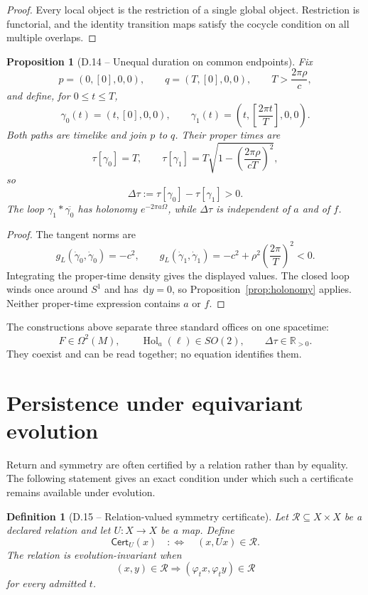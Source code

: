 \documentclass[11pt,letterpaper]{article}
\theoremstyle{dynamicsstyle}
\newtheorem{proposition}[theorem]{Proposition}
\newtheorem{definition}[theorem]{Definition}
\newcommand{\R}{\mathbb{R}}
\newcommand{\Hol}{\operatorname{Hol}}
\newcommand{\dd}{\,\mathrm d}
\newcommand{\Flow}{\varphi}
\newcommand{\Cert}{\mathsf{Cert}}
\begin{document}
\begin{proof}
Every local object is the restriction of a single global object.  Restriction is functorial, and the identity transition maps satisfy the cocycle condition on all multiple overlaps.
\end{proof}

\begin{proposition}[D.14 -- Unequal duration on common endpoints]\label{prop:proper-time}
Fix
\[
p=(0,[0],0,0),
\qquad
q=(T,[0],0,0),
\qquad
T>\frac{2\pi\rho}{c},
\]
and define, for $0\le t\le T$,
\[
\gamma_0(t)=(t,[0],0,0),
\qquad
\gamma_1(t)=\left(t,\left[\frac{2\pi t}{T}\right],0,0\right).
\]
Both paths are timelike and join $p$ to $q$.  Their proper times are
\[
\tau[\gamma_0]=T,
\qquad
\tau[\gamma_1]
=T\sqrt{1-\left(\frac{2\pi\rho}{cT}\right)^2},
\]
so
\[
\Delta\tau:=\tau[\gamma_0]-\tau[\gamma_1]>0.
\]
The loop $\gamma_1*\overline{\gamma_0}$ has holonomy $e^{-2\pi a\Omega}$, while $\Delta\tau$ is independent of $a$ and of $f$.
\end{proposition}

\begin{proof}
The tangent norms are
\[
g_L(\dot\gamma_0,\dot\gamma_0)=-c^2,
\qquad
g_L(\dot\gamma_1,\dot\gamma_1)
=-c^2+\rho^2\left(\frac{2\pi}{T}\right)^2<0.
\]
Integrating the proper-time density gives the displayed values.  The closed loop winds once around $S^1$ and has $\dd y=0$, so Proposition~\ref{prop:holonomy} applies.  Neither proper-time expression contains $a$ or $f$.
\end{proof}

The constructions above separate three standard offices on one spacetime:
\[
F\in\Omega^2(M),
\qquad
\Hol_a(\ell)\in SO(2),
\qquad
\Delta\tau\in\R_{>0}.
\]
They coexist and can be read together; no equation identifies them.

\section{Persistence under equivariant evolution}\label{sec:persistence}

Return and symmetry are often certified by a relation rather than by equality.  The following statement gives an exact condition under which such a certificate remains available under evolution.

\begin{definition}[D.15 -- Relation-valued symmetry certificate]
Let $\mathcal R\subseteq X\times X$ be a declared relation and let $U:X\to X$ be a map.  Define
\[
\Cert_U(x)\quad:\Longleftrightarrow\quad (x,Ux)\in\mathcal R.
\]
The relation is evolution-invariant when
\[
(x,y)\in\mathcal R
\Longrightarrow
(\Flow_tx,\Flow_ty)\in\mathcal R
\]
for every admitted $t$.
\end{definition}
\end{document}

